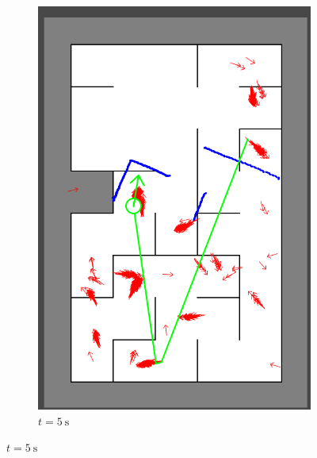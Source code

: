 \subsection{}
\subsubsection{}
\begin{figure}[H]
     \centering
     \begin{subfigure}{0.2\textwidth}
         \centering
         \includegraphics[width=\textwidth]{figures/localization_5s.png}
         \caption{$t = \SI{5}{\second}$}
         \label{mapping2s}
     \end{subfigure}

\end{figure}
